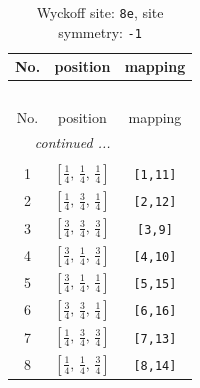 \documentclass[fleqn,8pt]{jsarticle}
\begin{document}
\renewcommand{\arraystretch}{1.2}
\begin{longtable}{ccc}
\caption{Wyckoff site: {\tt 8e}, site symmetry: {\tt -1}}
 \\
 \hline \hline
No. & position & mapping \\ \hline \endfirsthead

\multicolumn{2}{l}{\tablename\ \thetable{}} \\
 \hline \hline
No. & position & mapping \\ \hline \endhead

 \hline \hline
\multicolumn{2}{r}{\footnotesize\it continued ...} \\ \endfoot

 \hline \hline
\multicolumn{2}{r}{} \\ \endlastfoot

1 & $\left[ \frac{1}{4},\, \frac{1}{4},\, \frac{1}{4} \right]$ & {\tt [1,11]} \\ \hline
2 & $\left[ \frac{1}{4},\, \frac{3}{4},\, \frac{1}{4} \right]$ & {\tt [2,12]} \\ \hline
3 & $\left[ \frac{3}{4},\, \frac{3}{4},\, \frac{3}{4} \right]$ & {\tt [3,9]} \\ \hline
4 & $\left[ \frac{3}{4},\, \frac{1}{4},\, \frac{3}{4} \right]$ & {\tt [4,10]} \\ \hline
5 & $\left[ \frac{3}{4},\, \frac{1}{4},\, \frac{1}{4} \right]$ & {\tt [5,15]} \\ \hline
6 & $\left[ \frac{3}{4},\, \frac{3}{4},\, \frac{1}{4} \right]$ & {\tt [6,16]} \\ \hline
7 & $\left[ \frac{1}{4},\, \frac{3}{4},\, \frac{3}{4} \right]$ & {\tt [7,13]} \\ \hline
8 & $\left[ \frac{1}{4},\, \frac{1}{4},\, \frac{3}{4} \right]$ & {\tt [8,14]} \\
\end{longtable}
\renewcommand{\arraystretch}{1.2}
\end{document}
